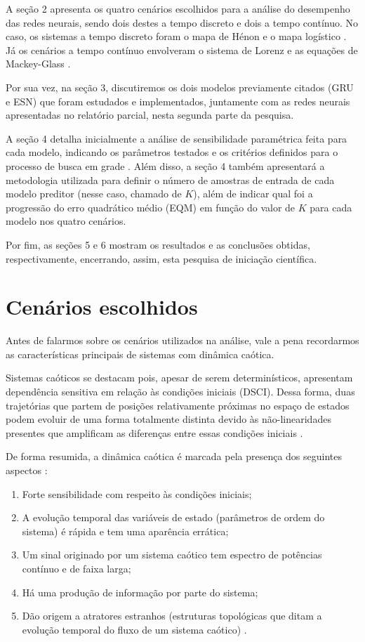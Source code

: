 \documentclass[a4paper, 12pt]{article}
\begin{document}
A seção 2 apresenta os quatro cenários escolhidos para a análise do desempenho das redes neurais, sendo dois destes a tempo discreto e dois a tempo contínuo. No caso, os sistemas a tempo discreto foram o mapa de Hénon \cite{henon1976two} e o mapa logístico \cite{may1976simple}. Já os cenários a tempo contínuo envolveram o sistema de Lorenz \cite{lorenz1963deterministic} e as equações de Mackey-Glass \cite{mackey1977oscillation}.

Por sua vez, na seção 3, discutiremos os dois modelos previamente citados (GRU e ESN) que foram estudados e implementados, juntamente com as redes neurais apresentadas no relatório parcial, nesta segunda parte da pesquisa. 

A seção 4 detalha inicialmente a análise de sensibilidade paramétrica feita para cada modelo, indicando os parâmetros testados e os critérios definidos para o processo de busca em grade \cite{geron2019hands}. Além disso, a seção 4 também apresentará a metodologia utilizada para definir o número de amostras de entrada de cada modelo preditor (nesse caso, chamado de $K$), além de indicar qual foi a progressão do erro quadrático médio (EQM) em função do valor de $K$ para cada modelo nos quatro cenários.

Por fim, as seções 5 e 6 mostram os resultados e as conclusões obtidas, respectivamente, encerrando, assim, esta pesquisa de iniciação científica.
 
\section{Cenários escolhidos}

Antes de falarmos sobre os cenários utilizados na análise, vale a pena recordarmos as características principais de sistemas com dinâmica caótica. 

Sistemas caóticos se destacam pois, apesar de serem determinísticos, apresentam dependência sensitiva em relação às condições iniciais (DSCI). Dessa forma, duas trajetórias que partem de posições relativamente próximas no espaço de estados podem evoluir de uma forma totalmente distinta devido às não-linearidades presentes que amplificam as diferenças entre essas condições iniciais \cite{fiedler1994caos}.

De forma resumida, a dinâmica caótica é marcada pela presença dos seguintes aspectos \cite{attux2001dinamica}:
\begin{enumerate}
\item Forte sensibilidade com respeito às condições iniciais;
\item A evolução temporal das variáveis de estado (parâmetros de ordem do sistema) é rápida e tem uma aparência errática;
\item Um sinal originado por um sistema caótico tem espectro de potências contínuo e de faixa larga;
\item Há uma produção de informação por parte do sistema;
\item Dão origem a atratores estranhos (estruturas topológicas que ditam a evolução temporal do fluxo de um sistema caótico) \cite{ruelle1971nature}.
\end{enumerate}
\end{document}
